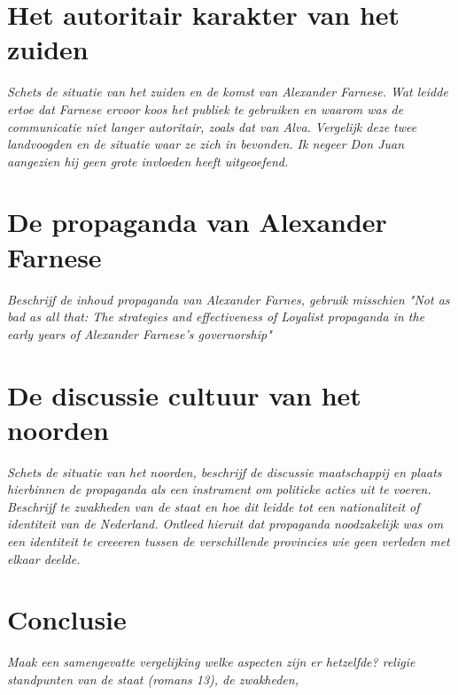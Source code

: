 \documentclass[11pt]{amsart}
\begin{document}
\newpage

\section{Het autoritair karakter van het zuiden}
\textit{Schets de situatie van het zuiden en de komst van Alexander Farnese. Wat leidde ertoe dat Farnese ervoor koos het
     publiek te gebruiken en waarom was de communicatie niet langer autoritair, zoals dat van Alva. Vergelijk deze twee
     landvoogden en de situatie waar ze zich in bevonden. Ik negeer Don Juan aangezien hij geen grote invloeden heeft
     uitgeoefend.}

\section{De propaganda van Alexander Farnese}
\textit{Beschrijf de inhoud propaganda van Alexander Farnes, gebruik misschien "Not as bad as all that: The strategies and effectiveness of Loyalist propaganda in the early years of Alexander Farnese's governorship"}

\section{De discussie cultuur van het noorden}
\textit{Schets de situatie van het noorden, beschrijf de discussie maatschappij en plaats hierbinnen de propaganda als een
     instrument om politieke acties uit te voeren. Beschrijf te zwakheden van de staat en hoe dit leidde tot een nationaliteit of identiteit van de Nederland. Ontleed hieruit dat propaganda noodzakelijk was om een identiteit te creeeren tussen de verschillende provincies wie geen verleden met elkaar deelde. }

\section{Conclusie}
\textit{Maak een samengevatte vergelijking welke aspecten zijn er hetzelfde? religie standpunten van de staat (romans 13), de zwakheden, }

\newpage\printbibliography{}
\end{document}
